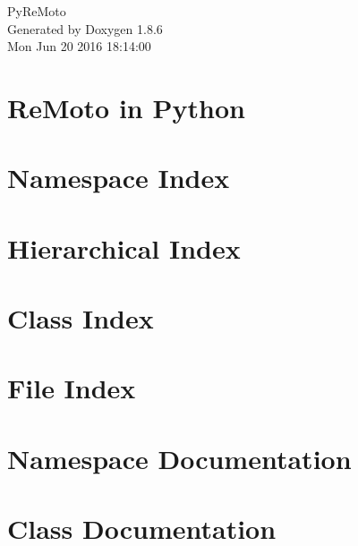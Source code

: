 \documentclass[twoside]{book}
\newcommand{\clearemptydoublepage}{%
  \newpage{\pagestyle{empty}\cleardoublepage}%
}
\begin{document}
\hypersetup{pageanchor=false}
\begin{titlepage}
\vspace*{7cm}
\begin{center}%
{\Large Py\-Re\-Moto }\\
\vspace*{1cm}
{\large Generated by Doxygen 1.8.6}\\
\vspace*{0.5cm}
{\small Mon Jun 20 2016 18:14:00}\\
\end{center}
\end{titlepage}
\clearemptydoublepage
\tableofcontents
\clearemptydoublepage
{}
\hypersetup{pageanchor=true}

\chapter{Re\-Moto in Python}
\label{index}\hypertarget{index}{}
\chapter{Namespace Index}

\chapter{Hierarchical Index}

\chapter{Class Index}

\chapter{File Index}

\chapter{Namespace Documentation}













\chapter{Class Documentation}












\end{document}
